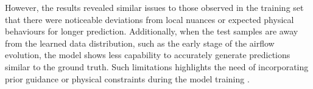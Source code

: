 \documentclass[final-report]{article-template}
\begin{document}
However, the results revealed similar issues to those observed in the training set that there were noticeable deviations from local nuances or expected physical behaviours for longer prediction. Additionally, when the test samples are away from the learned data distribution, such as the early stage of the airflow evolution, the model shows less capability to accurately generate predictions similar to the ground truth. Such limitations highlights the need of incorporating prior guidance or physical constraints during the model training \cite{gao2024prediff, bian2024diffusion}.



\clearpage
\end{document}
